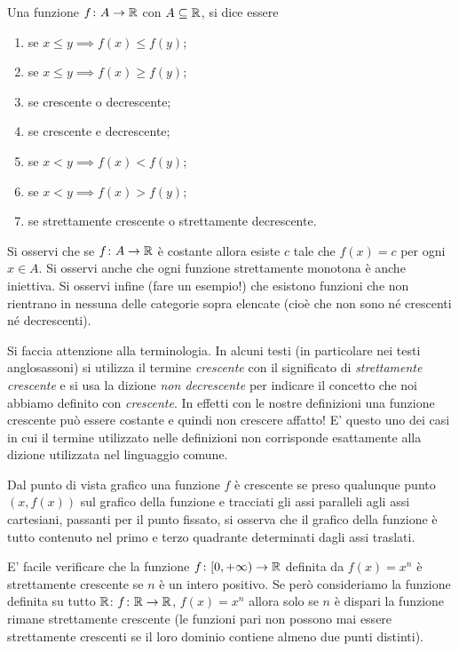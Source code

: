 \begin{definition}
\label{def:monotonia}%
\mymark{***}%
%
%
%
Una funzione $f\colon A \to \mathbb R$ con $A\subseteq \mathbb R$, si
dice essere
\begin{enumerate}
\item {} se $x \le y \implies f(x) \le f(y)$;
\item {} se $x \le y \implies f(x) \ge f(y)$;
\item {} se crescente o decrescente;
\item {} se crescente e decrescente;
\item {} se $x<y \implies f(x) < f(y)$;
\item {} se $x<y \implies f(x) > f(y)$;
\item {} se strettamente crescente o strettamente decrescente.
\end{enumerate}
\end{definition}

Si osservi che se $f\colon A \to \mathbb R$ è costante allora esiste $c$ tale che
$f(x)=c$ per ogni $x\in A$. Si osservi anche che ogni funzione strettamente monotona è anche iniettiva. Si osservi infine (fare un esempio!) che esistono funzioni che non rientrano in nessuna delle categorie sopra elencate (cioè che non sono né crescenti né decrescenti).

Si faccia attenzione alla terminologia.
In alcuni testi (in particolare nei testi anglosassoni) si utilizza il termine
\emph{crescente} con il significato di \emph{strettamente crescente} e si usa la dizione \emph{non decrescente} per indicare il concetto che noi abbiamo definito con \emph{crescente}. In
effetti con le nostre definizioni una funzione crescente può essere costante
e quindi non crescere affatto!
E' questo uno dei casi in cui il termine utilizzato nelle definizioni non corrisponde esattamente alla dizione utilizzata
nel linguaggio comune.

Dal punto di vista grafico una funzione $f$ è crescente
se preso qualunque punto $(x,f(x))$ sul grafico della funzione
e tracciati gli assi paralleli agli assi cartesiani, passanti
per il punto fissato, si osserva che il grafico della funzione
è tutto contenuto nel primo e terzo quadrante determinati
dagli assi traslati.

E' facile verificare che la funzione $f\colon [0,+\infty)\to \mathbb R$
definita da $f(x)=x^n$
è strettamente crescente se $n$ è un intero positivo.
Se però consideriamo la funzione definita su tutto
$\mathbb R$: $f\colon \mathbb R \to \mathbb R$,
$f(x)=x^n$ allora solo se $n$ è dispari la funzione rimane
strettamente crescente
(le funzioni pari non possono mai essere strettamente crescenti se
il loro dominio contiene almeno due punti distinti).

